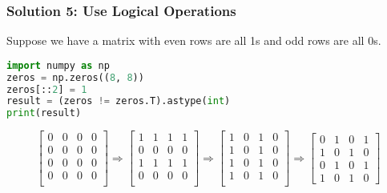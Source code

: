 \documentclass[beamer, en, version=2.0]{huangfusl-template}
\begin{document}
    \begin{frame}[fragile]
        \frametitle{Solution 5: Use Logical Operations}

        Suppose we have a matrix with even rows are all 1s and odd rows are all 0s.

\begin{lstlisting}[language=python]
import numpy as np
zeros = np.zeros((8, 8))
zeros[::2] = 1
result = (zeros != zeros.T).astype(int)
print(result)
\end{lstlisting}

        \begin{equation*}
            \begin{bmatrix}
                0 & 0 & 0 & 0 \\
                0 & 0 & 0 & 0 \\
                0 & 0 & 0 & 0 \\
                0 & 0 & 0 & 0 \\
            \end{bmatrix} \Longrightarrow \begin{bmatrix}
                1 & 1 & 1 & 1 \\
                0 & 0 & 0 & 0 \\
                1 & 1 & 1 & 1 \\
                0 & 0 & 0 & 0 \\
            \end{bmatrix} \Longrightarrow \begin{bmatrix}
                1 & 0 & 1 & 0 \\
                1 & 0 & 1 & 0 \\
                1 & 0 & 1 & 0 \\
                1 & 0 & 1 & 0 \\
            \end{bmatrix} \Longrightarrow \begin{bmatrix}
                0 & 1 & 0 & 1 \\
                1 & 0 & 1 & 0 \\
                0 & 1 & 0 & 1 \\
                1 & 0 & 1 & 0
            \end{bmatrix}
        \end{equation*}
    \end{frame}
\end{document}
